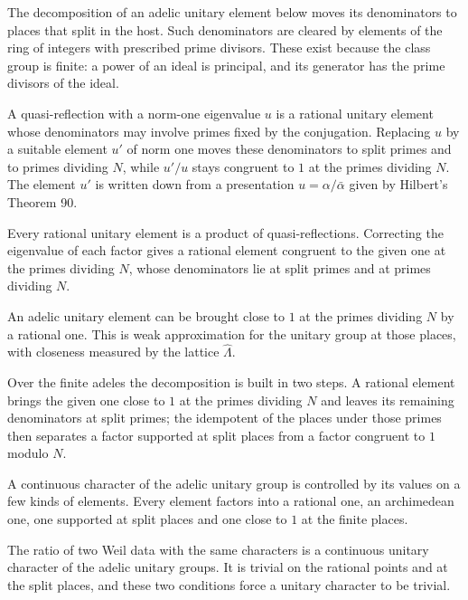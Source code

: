 The decomposition of an adelic unitary element below moves its denominators to places that split in
the host. Such denominators are cleared by elements of the ring of integers with prescribed prime
divisors. These exist because the class group is finite: a power of an ideal is principal, and its
generator has the prime divisors of the ideal.

A quasi-reflection with a norm-one eigenvalue $u$ is a rational unitary element whose denominators may
involve primes fixed by the conjugation. Replacing $u$ by a suitable element $u'$ of norm one moves these
denominators to split primes and to primes dividing $N$, while $u'/u$ stays congruent to $1$ at the
primes dividing $N$. The element $u'$ is written down from a presentation $u=\alpha/\bar\alpha$ given by
Hilbert's Theorem 90.

Every rational unitary element is a product of quasi-reflections. Correcting the eigenvalue of each
factor gives a rational element congruent to the given one at the primes dividing $N$, whose
denominators lie at split primes and at primes dividing $N$.

An adelic unitary element can be brought close to $1$ at the primes dividing $N$ by a rational one. This
is weak approximation for the unitary group at those places, with closeness measured by the lattice
$\hat\Lambda$.

Over the finite adeles the decomposition is built in two steps. A rational element brings the given one
close to $1$ at the primes dividing $N$ and leaves its remaining denominators at split primes; the
idempotent of the places under those primes then separates a factor supported at split places from a
factor congruent to $1$ modulo $N$.

A continuous character of the adelic unitary group is controlled by its values on a few kinds of
elements. Every element factors into a rational one, an archimedean one, one supported at split places
and one close to $1$ at the finite places.

The ratio of two Weil data with the same characters is a continuous unitary character of the adelic
unitary groups. It is trivial on the rational points and at the split places, and these two conditions
force a unitary character to be trivial.

